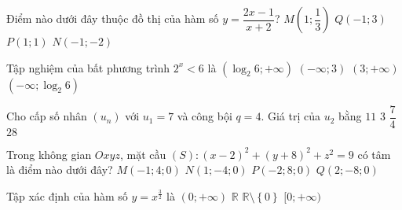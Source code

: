 \begin{ex}%
	Điểm nào dưới đây thuộc đồ thị của hàm số $y = \dfrac{2x - 1}{x + 2}$?
	\choice
	{\True $M\left( 1;\dfrac{1}{3} \right)$}
	{$Q(-1;3)$}
	{$P(1;1)$}
	{$N(-1;-2)$}
\end{ex}

\begin{ex}%
	Tập nghiệm của bất phương trình $2^x < 6$ là
	\choice
	{$(\log_{2}6; +\infty)$}
	{$(-\infty; 3)$}
	{$(3; + \infty)$}
	{\True $(-\infty; \log_{2}6)$}
\end{ex}

\begin{ex}%
	Cho cấp số nhân $(u_n)$ với $u_1 = 7$ và công bội $q = 4$. Giá trị của $u_2$ bằng
	\choice
	{$11$}
	{$3$}
	{$\dfrac{7}{4}$}
	{\True $28$}
\end{ex}

\begin{ex}%
	Trong không gian $Oxyz$, mặt cầu $(S)\colon (x-2)^2 + (y+8)^2 + z^2 = 9$ có tâm là điểm nào dưới đây?
	\choice
	{$M(-1;4;0)$}
	{$N(1;-4;0)$}
	{$P(-2;8;0)$}
	{\True $Q(2;-8;0)$}
\end{ex}

\begin{ex}%
Tập xác định của hàm số $y = x^{\tfrac{3}{2}}$ là
	\choice
	{\True $(0;+\infty)$}
	{$\mathbb{R}$}
	{$\mathbb{R}\setminus \left\lbrace 0 \right\rbrace $}
	{$[0;+\infty)$}
\end{ex}



